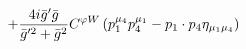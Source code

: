 %
\begin{dmath*}
%
  +  \frac{4 i {\bar g}^\prime {\bar g}{}}{{\bar g}^{\prime 2} + {\bar g}{}^2}C^{ \varphi  W} \left(p_1^{\mu_4} p_4^{\mu_1} - p_{1}\nobreak\cdot\nobreak{}p_{4} \eta_{\mu_1 \mu_4}\right)
%
\end{dmath*}
%
